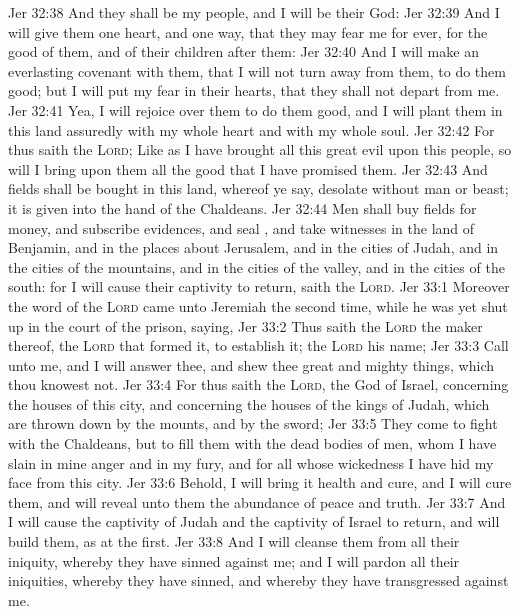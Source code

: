 \vs Jer 32:38 And they shall be my people, and I will be their God:
\vs Jer 32:39 And I will give them one heart, and one way, that they may fear me for ever, for the good of them, and of their children after them:
\vs Jer 32:40 And I will make an everlasting covenant with them, that I will not turn away from them, to do them good; but I will put my fear in their hearts, that they shall not depart from me.
\vs Jer 32:41 Yea, I will rejoice over them to do them good, and I will plant them in this land assuredly with my whole heart and with my whole soul.
\vs Jer 32:42 For thus saith the \textsc{Lord}; Like as I have brought all this great evil upon this people, so will I bring upon them all the good that I have promised them.
\vs Jer 32:43 And fields shall be bought in this land, whereof ye say,  desolate without man or beast; it is given into the hand of the Chaldeans.
\vs Jer 32:44 Men shall buy fields for money, and subscribe evidences, and seal , and take witnesses in the land of Benjamin, and in the places about Jerusalem, and in the cities of Judah, and in the cities of the mountains, and in the cities of the valley, and in the cities of the south: for I will cause their captivity to return, saith the \textsc{Lord}.
\vs Jer 33:1 Moreover the word of the \textsc{Lord} came unto Jeremiah the second time, while he was yet shut up in the court of the prison, saying,
\vs Jer 33:2 Thus saith the \textsc{Lord} the maker thereof, the \textsc{Lord} that formed it, to establish it; the \textsc{Lord}  his name;
\vs Jer 33:3 Call unto me, and I will answer thee, and shew thee great and mighty things, which thou knowest not.
\vs Jer 33:4 For thus saith the \textsc{Lord}, the God of Israel, concerning the houses of this city, and concerning the houses of the kings of Judah, which are thrown down by the mounts, and by the sword;
\vs Jer 33:5 They come to fight with the Chaldeans, but  to fill them with the dead bodies of men, whom I have slain in mine anger and in my fury, and for all whose wickedness I have hid my face from this city.
\vs Jer 33:6 Behold, I will bring it health and cure, and I will cure them, and will reveal unto them the abundance of peace and truth.
\vs Jer 33:7 And I will cause the captivity of Judah and the captivity of Israel to return, and will build them, as at the first.
\vs Jer 33:8 And I will cleanse them from all their iniquity, whereby they have sinned against me; and I will pardon all their iniquities, whereby they have sinned, and whereby they have transgressed against me.
